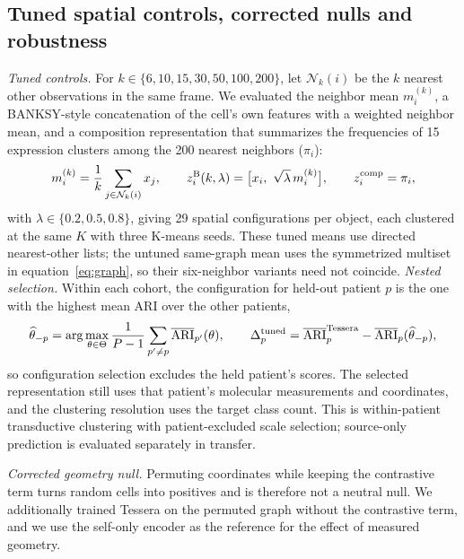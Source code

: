 \documentclass[11pt]{article}
\begin{document}
\subsection{Tuned spatial controls, corrected nulls and robustness}\label{sec:robustness}
\emph{Tuned controls.} For \(k\in\{6,10,15,30,50,100,200\}\), let \(\mathcal N_k(i)\) be the \(k\) nearest other observations in the same frame. We evaluated the neighbor mean \(m_i^{(k)}\), a BANKSY-style concatenation of the cell's own features with a weighted neighbor mean, and a composition representation that summarizes the frequencies of 15 expression clusters among the 200 nearest neighbors (\(\pi_i\)):
\begin{equation}
m_i^{(k)}=\frac1k\sum_{j\in\mathcal N_k(i)}x_j,\qquad
z_i^{\rm B}(k,\lambda)=\bigl[x_i,\ \sqrt\lambda\,m_i^{(k)}\bigr],\qquad
z_i^{\rm comp}=\pi_i,\label{eq:tuned}
\end{equation}
with \(\lambda\in\{0.2,0.5,0.8\}\), giving 29 spatial configurations per object, each clustered at the same \(K\) with three K-means seeds. These tuned means use directed nearest-other lists; the untuned same-graph mean uses the symmetrized multiset in equation~\eqref{eq:graph}, so their six-neighbor variants need not coincide. \emph{Nested selection.} Within each cohort, the configuration for held-out patient \(p\) is the one with the highest mean ARI over the other patients,
\begin{equation}
\widehat\theta_{-p}=\arg\max_{\theta\in\Theta}\frac{1}{P-1}\sum_{p'\ne p}\overline{\operatorname{ARI}}_{p'}(\theta),\qquad
\Delta^{\rm tuned}_p=\overline{\operatorname{ARI}}_p^{\rm Tessera}-\overline{\operatorname{ARI}}_p(\widehat\theta_{-p}),\label{eq:nested}
\end{equation}
so configuration selection excludes the held patient's scores. The selected representation still uses that patient's molecular measurements and coordinates, and the clustering resolution uses the target class count. This is within-patient transductive clustering with patient-excluded scale selection; source-only prediction is evaluated separately in transfer.

\emph{Corrected geometry null.} Permuting coordinates while keeping the contrastive term turns random cells into positives and is therefore not a neutral null. We additionally trained Tessera on the permuted graph without the contrastive term, and we use the self-only encoder as the reference for the effect of measured geometry.
\end{document}

